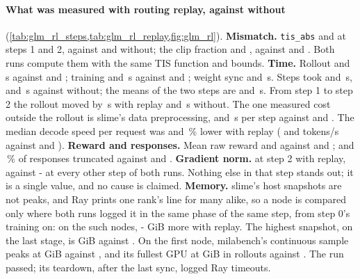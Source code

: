 \paragraph{What was measured with routing replay, against without} (\cref{tab:glm_rl_steps,tab:glm_rl_replay,fig:glm_rl}). \textbf{Mismatch.} \texttt{tis\_abs} \TriGrRpTisAbsOne{} and \TriGrRpTisAbsTwo{} at steps 1 and 2, against \TriGrTisAbsOne{} and \TriGrTisAbsTwo{} without; the clip fraction \TriGrRpTisClipOne{} and \TriGrRpTisClipTwo, against \TriGrTisClipOne{} and \TriGrTisClipTwo. Both runs compute them with the same TIS function and bounds. \textbf{Time.} Rollout \TriGrRpRolloutOne{} and \TriGrRpRolloutTwo\,s against \TriGrRolloutOne{} and \TriGrRolloutTwo; training \TriGrRpTrainOne{} and \TriGrRpTrainTwo\,s against \TriGrTrainOne{} and \TriGrTrainTwo; weight sync \TriGrRpSyncOne{} and \TriGrRpSyncTwo\,s. Steps took \TriGrRpStepOne{} and \TriGrRpStepTwo\,s, \TriGrRpStepDiffOne{} and \TriGrRpStepDiffTwo\,s against without; the means of the two steps are \TriGrRpStepMean{} and \TriGrStepMean\,s. From step 1 to step 2 the rollout moved by \TriGrRpRolloutSpread\,s with replay and \TriGrRolloutSpread\,s without. The one measured cost outside the rollout is slime's data preprocessing, \TriGrRpPrepOne{} and \TriGrRpPrepTwo\,s per step against \TriGrPrepOne{} and \TriGrPrepTwo. The median decode speed per request was \TriGrRpDecodeDropOne{} and \TriGrRpDecodeDropTwo\,\% lower with replay (\TriGrRpDecodeReqOne{} and \TriGrRpDecodeReqTwo{} tokens/s against \TriGrDecodeReqOne{} and \TriGrDecodeReqTwo). \textbf{Reward and responses.} Mean raw reward \TriGrRpRewardOne{} and \TriGrRpRewardTwo{} against \TriGrRewardOne{} and \TriGrRewardTwo; \TriGrRpTruncOne{} and \TriGrRpTruncTwo\,\% of responses truncated against \TriGrTruncOne{} and \TriGrTruncTwo. \textbf{Gradient norm.} \TriGrRpGradTwo{} at step 2 with replay, against \TriGrGradOthersLo-\TriGrGradOthersHi{} at every other step of both runs. Nothing else in that step stands out; it is a single value, and no cause is claimed. \textbf{Memory.} slime's host snapshots are not peaks, and Ray prints one rank's line for many alike, so a node is compared only where both runs logged it in the same phase of the same step, from step 0's training on: on the \TriGrRpHostNodes{} such nodes, \TriGrRpHostLo-\TriGrRpHostHi{} GiB more with replay. The highest snapshot, on the last stage, is \TriGrRpHostLastHi{} GiB against \TriGrHostLastHi. On the first node, milabench's continuous sample peaks at \TriGrRpHeadHost{} GiB against \TriGrHeadHost, and its fullest GPU at \TriGrRpGpuRollout{} GiB in rollouts against \TriGrGpuRollout. The run passed; its teardown, after the last sync, logged Ray timeouts.

